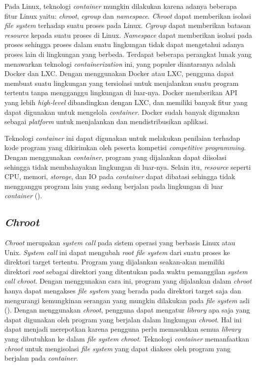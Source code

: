 \par Pada Linux, teknologi \textit{container} mungkin dilakukan karena adanya beberapa fitur Linux yaitu: \textit{chroot}, \textit{cgroup} dan \textit{namespace}. \textit{Chroot} dapat memberikan isolasi \textit{file system} terhadap suatu proses pada Linux. \textit{Cgroup} dapat memberikan batasan \textit{resource} kepada suatu proses di Linux. \textit{Namespace} dapat memberikan isolasi pada proses sehingga proses dalam suatu lingkungan tidak dapat mengetahui adanya proses lain di lingkungan yang berbeda. Terdapat beberapa perangkat lunak yang menawarkan teknologi \textit{containerization} ini, yang populer diantaranya adalah Docker dan LXC. Dengan menggunakan Docker atau LXC, pengguna dapat membuat suatu lingkungan yang tersiolasi untuk menjalankan suatu program tertentu tanpa mengganggu lingkungan di luar-nya. Docker memberikan API yang lebih \textit{high-level} dibandingkan dengan LXC, dan memiliki banyak fitur yang dapat digunakan untuk mengelola \textit{container}. Docker sudah banyak digunakan sebagai \textit{platform} untuk menjalankan dan mendistribusikan aplikasi.

\par Teknologi \textit{container} ini dapat digunakan untuk melakukan penilaian terhadap kode program yang dikirimkan oleh peserta kompetisi \textit{competitive programming}. Dengan menggunakan \textit{container}, program yang dijalankan dapat diisolasi sehingga tidak membahayakan lingkungan di luar-nya. Selain itu, \textit{resource} seperti CPU, memori, \textit{storage}, dan IO pada \textit{container} dapat dibatasi sehingga tidak mengganggu program lain yang sedang berjalan pada lingkungan di luar \textit{container} (\cite{merkeldocker}).

\subsection{\textit{Chroot}}

\par \textit{Chroot} merupakan \textit{system call} pada sistem operasi yang berbasis Linux atau Unix. \textit{System call} ini dapat mengubah \textit{root file system} dari suatu proses ke direktori target tertentu. Program yang dijalankan seakan-akan memiliki direktori \textit{root} sebagai direktori yang ditentukan pada waktu pemanggilan \textit{system call} \textit{chroot}. Dengan menggunakan cara ini, program yang dijalankan dalam \textit{chroot} hanya dapat mengakses \textit{file system} yang berada pada direktori target saja dan mengurangi kemungkinan serangan yang mungkin dilakukan pada \textit{file system} asli (\cite{lessardchroot}). Dengan menggunakan \textit{chroot}, pengguna dapat mengatur \textit{library} apa saja yang dapat digunakan oleh program yang berjalan dalam lingkungan \textit{chroot}. Hal ini dapat menjadi merepotkan karena pengguna perlu memasukkan semua \textit{library} yang dibutuhkan ke dalam \textit{file system} \textit{chroot}. Teknologi \textit{container} memanfaatkan \textit{chroot} untuk mengisolasi \textit{file system} yang dapat diakses oleh program yang berjalan pada \textit{container}.

